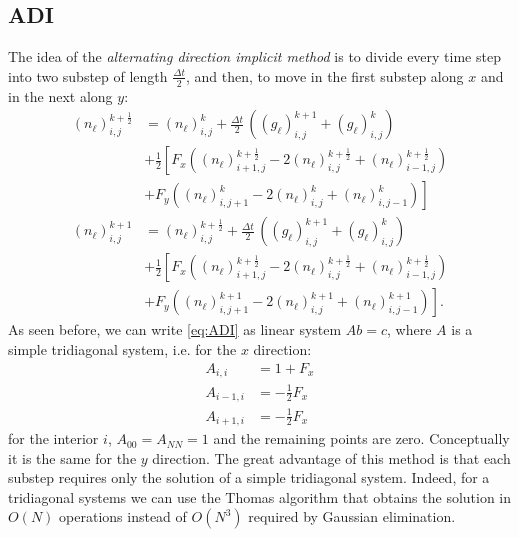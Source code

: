 \subsection{ADI}

The idea of the \textit{alternating direction implicit method} is
to divide every time step into two substep of length $\frac{\Delta t}{2}$,
and then, to move in the first substep along $x$ and in the next
along $y$: 
\begin{align}
\left(n_{\ell}\right)_{i,j}^{k+\frac{1}{2}} & =\left(n_{\ell}\right)_{i,j}^{k}+\frac{\Delta t}{2}\,\left(\left(g_{\ell}\right)_{i,j}^{k+1}+\left(g_{\ell}\right)_{i,j}^{k}\right)\nonumber \\
 & +\frac{1}{2}\left[F_{x}\left(\left(n_{\ell}\right)_{i+1,j}^{k+\frac{1}{2}}-2\left(n_{\ell}\right)_{i,j}^{k+\frac{1}{2}}+\left(n_{\ell}\right)_{i-1,j}^{k+\frac{1}{2}}\right)\right.\nonumber \\
 & \left.+F_{y}\left(\left(n_{\ell}\right)_{i,j+1}^{k}-2\left(n_{\ell}\right)_{i,j}^{k}+\left(n_{\ell}\right)_{i,j-1}^{k}\right)\right]\nonumber \\
\left(n_{\ell}\right)_{i,j}^{k+1} & =\left(n_{\ell}\right)_{i,j}^{k+\frac{1}{2}}+\frac{\Delta t}{2}\,\left(\left(g_{\ell}\right)_{i,j}^{k+1}+\left(g_{\ell}\right)_{i,j}^{k}\right)\nonumber \\
 & +\frac{1}{2}\left[F_{x}\left(\left(n_{\ell}\right)_{i+1,j}^{k+\frac{1}{2}}-2\left(n_{\ell}\right)_{i,j}^{k+\frac{1}{2}}+\left(n_{\ell}\right)_{i-1,j}^{k+\frac{1}{2}}\right)\right.\nonumber \\
 & \left.+F_{y}\left(\left(n_{\ell}\right)_{i,j+1}^{k+1}-2\left(n_{\ell}\right)_{i,j}^{k+1}+\left(n_{\ell}\right)_{i,j-1}^{k+1}\right)\right].\label{eq:ADI}
\end{align}
As seen before, we can write \ref{eq:ADI} as linear system $Ab=c$,
where $A$ is a simple tridiagonal system, i.e. for the $x$ direction:
\begin{align*}
A_{i,i} & =1+F_{x}\\
A_{i-1,i} & =-\frac{1}{2}F_{x}\\
A_{i+1,i} & =-\frac{1}{2}F_{x}
\end{align*}
for the interior $i$, $A_{00}=A_{NN}=1$ and the remaining points
are zero. Conceptually it is the same for the $y$ direction. The
great advantage of this method is that each substep requires only
the solution of a simple tridiagonal system. Indeed, for a tridiagonal
systems we can use the Thomas algorithm that obtains the solution
in $O\left(N\right)$ operations instead of $O\left(N^{3}\right)$
required by Gaussian elimination. 

